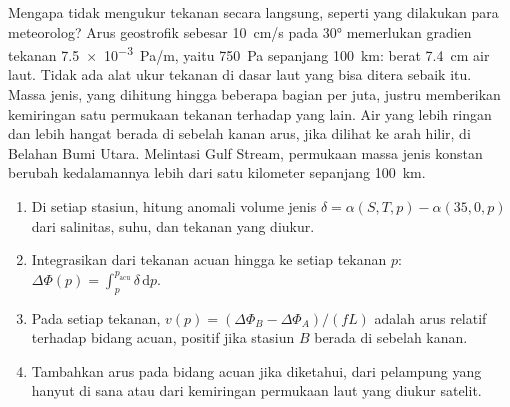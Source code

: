 Mengapa tidak mengukur tekanan secara langsung, seperti yang dilakukan para meteorolog? Arus geostrofik
sebesar \qty{10}{cm/s} pada \ang{30} memerlukan gradien tekanan
\qty{7.5e-3}{Pa/m}, yaitu \qty{750}{Pa} sepanjang \qty{100}{km}: berat
\qty{7.4}{cm} air laut. Tidak ada alat ukur tekanan di dasar laut yang bisa
ditera sebaik itu. Massa jenis, yang dihitung hingga beberapa bagian per juta,
justru memberikan kemiringan satu permukaan tekanan terhadap yang lain. Air
yang lebih ringan dan lebih hangat berada di sebelah kanan arus, jika dilihat ke arah hilir,
di Belahan Bumi Utara. Melintasi Gulf Stream, permukaan massa jenis konstan
berubah kedalamannya lebih dari satu kilometer sepanjang \qty{100}{km}.

\begin{method}\label{met:b3:ocean-dynamics:dynamic}
\begin{enumerate}
\item Di setiap stasiun, hitung anomali volume jenis $\delta =
  \alpha(S, T, p) - \alpha(35, 0, p)$ dari salinitas, suhu, dan
  tekanan yang diukur.
\item Integrasikan dari tekanan acuan hingga ke setiap tekanan $p$:
  $\Delta\Phi(p) = \int_p^{p_{\text{acu}}}\delta\,\mathrm dp$.
\item Pada setiap tekanan, $v(p) = (\Delta\Phi_B - \Delta\Phi_A)/(fL)$ adalah
  arus relatif terhadap bidang acuan, positif jika stasiun $B$
  berada di sebelah kanan.
\item Tambahkan arus pada bidang acuan jika diketahui, dari pelampung
  yang hanyut di sana atau dari kemiringan permukaan laut yang diukur satelit.
\end{enumerate}
\end{method}

